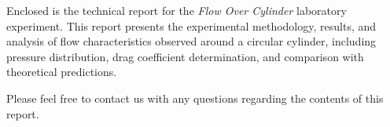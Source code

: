 


\usetikzlibrary{arrows.meta, decorations.markings, patterns, calc, positioning}

\fancyhead[C]{}
\fancyheadwidth[L]{0.5\headwidth}
\fancyheadwidth[C]{0.0\headwidth}
\fancyheadwidth[R]{0.5\headwidth}







\hypertarget{titlepage}{\maketitle}
\thispagestyle{empty}

\pagebreak


\thispagestyle{empty}

\DTMtoday

\vspace{5.0ex}

Enclosed is the technical report for the \textit{Flow Over Cylinder} laboratory experiment. This report presents the experimental methodology, results, and analysis of flow characteristics observed around a circular cylinder, including pressure distribution, drag coefficient determination, and comparison with theoretical predictions.

Please feel free to contact us with any questions regarding the contents of this report.

